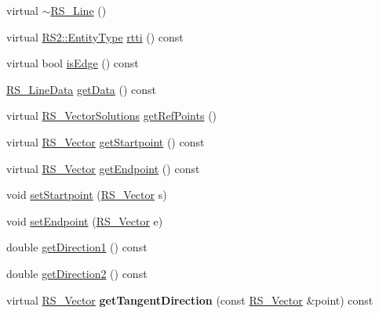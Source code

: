 \begin{DoxyCompactItemize}
\item 
virtual \hyperlink{classRS__Line_a33b6bf4cf71fdc6dd71f99d3f576d636}{$\sim$\-R\-S\-\_\-\-Line} ()
\item 
virtual \hyperlink{classRS2_a8f26d1b981e1e85cff16738b43337e6a}{R\-S2\-::\-Entity\-Type} \hyperlink{classRS__Line_a42ebe4ce611436da4b62b9326fc8ffb3}{rtti} () const 
\item 
virtual bool \hyperlink{classRS__Line_a51732a607e84e58ac979b0787dd745a0}{is\-Edge} () const 
\item 
\hyperlink{classRS__LineData}{R\-S\-\_\-\-Line\-Data} \hyperlink{classRS__Line_a4d23e2292e2af8feed9f8623d9372cb3}{get\-Data} () const 
\item 
virtual \hyperlink{classRS__VectorSolutions}{R\-S\-\_\-\-Vector\-Solutions} \hyperlink{classRS__Line_a41d089f7aca91ef8a85e9d9009c306d8}{get\-Ref\-Points} ()
\item 
virtual \hyperlink{classRS__Vector}{R\-S\-\_\-\-Vector} \hyperlink{classRS__Line_a5d53d135911c6dcf94f6c50775743780}{get\-Startpoint} () const 
\item 
virtual \hyperlink{classRS__Vector}{R\-S\-\_\-\-Vector} \hyperlink{classRS__Line_a91191443f65a565aaf841dd4a5b25b36}{get\-Endpoint} () const 
\item 
void \hyperlink{classRS__Line_a22eda6e6a245e13073d8c028590b2c80}{set\-Startpoint} (\hyperlink{classRS__Vector}{R\-S\-\_\-\-Vector} s)
\item 
void \hyperlink{classRS__Line_ad35d7a701f17459fa29f69ed9ed048fb}{set\-Endpoint} (\hyperlink{classRS__Vector}{R\-S\-\_\-\-Vector} e)
\item 
double \hyperlink{classRS__Line_aaaa6ab5a8de8ddc3506e46fb8bbbc7ce}{get\-Direction1} () const 
\item 
double \hyperlink{classRS__Line_a7a886cac6188862bb4b2be3ea013c5c4}{get\-Direction2} () const 
\item 
\hypertarget{classRS__Line_a454bbe44b6d05574ae2f2bed50cc03d9}{virtual \hyperlink{classRS__Vector}{R\-S\-\_\-\-Vector} {\bfseries get\-Tangent\-Direction} (const \hyperlink{classRS__Vector}{R\-S\-\_\-\-Vector} \&point) const }\label{classRS__Line_a454bbe44b6d05574ae2f2bed50cc03d9}


\end{DoxyCompactItemize}
